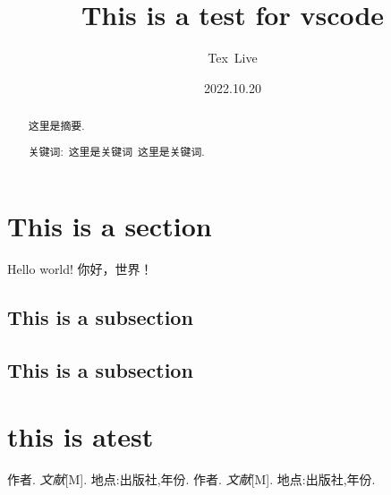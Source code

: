 \documentclass[a4paper]{article}
\begin{document}
\title{This is a test for vscode}
\author{Tex\ Live}
\date{2022.10.20}
\maketitle

\begin{abstract}
    这里是摘要.

    关键词:\ 这里是关键词\ 这里是关键词.
\end{abstract}

\tableofcontents
\section{This is a section}
Hello world! 你好，世界！
\subsection{This is a subsection}
\subsection{This is a subsection}

\section{this is atest}

\begin{thebibliography}{99}
    作者. \emph{文献}[M]. 地点:出版社,年份.
    作者. \emph{文献}[M]. 地点:出版社,年份.
\end{thebibliography}
\end{document}
